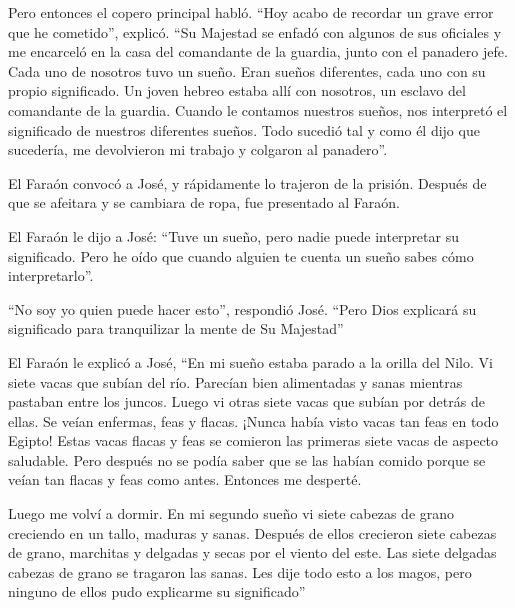  Pero entonces el copero principal habló. ``Hoy acabo de
recordar un grave error que he cometido'', explicó.  ``Su
Majestad se enfadó con algunos de sus oficiales y me encarceló en la
casa del comandante de la guardia, junto con el panadero jefe.
 Cada uno de nosotros tuvo un sueño. Eran sueños
diferentes, cada uno con su propio significado.  Un joven
hebreo estaba allí con nosotros, un esclavo del comandante de la
guardia. Cuando le contamos nuestros sueños, nos interpretó el
significado de nuestros diferentes sueños.  Todo sucedió
tal y como él dijo que sucedería, me devolvieron mi trabajo y colgaron
al panadero''.

 El Faraón convocó a José, y rápidamente lo trajeron de la
prisión. Después de que se afeitara y se cambiara de ropa, fue
presentado al Faraón.

 El Faraón le dijo a José: ``Tuve un sueño, pero nadie
puede interpretar su significado. Pero he oído que cuando alguien te
cuenta un sueño sabes cómo interpretarlo''.

 ``No soy yo quien puede hacer esto'', respondió José.
``Pero Dios explicará su significado para tranquilizar la mente de Su
Majestad''

 El Faraón le explicó a José, ``En mi sueño estaba parado a
la orilla del Nilo.  Vi siete vacas que subían del río.
Parecían bien alimentadas y sanas mientras pastaban entre los juncos.
 Luego vi otras siete vacas que subían por detrás de ellas.
Se veían enfermas, feas y flacas. ¡Nunca había visto vacas tan feas en
todo Egipto!  Estas vacas flacas y feas se comieron las
primeras siete vacas de aspecto saludable.  Pero después no
se podía saber que se las habían comido porque se veían tan flacas y
feas como antes. Entonces me desperté.

 Luego me volví a dormir. En mi segundo sueño vi siete
cabezas de grano creciendo en un tallo, maduras y sanas. 
Después de ellos crecieron siete cabezas de grano, marchitas y delgadas
y secas por el viento del este.  Las siete delgadas cabezas
de grano se tragaron las sanas. Les dije todo esto a los magos, pero
ninguno de ellos pudo explicarme su significado''

